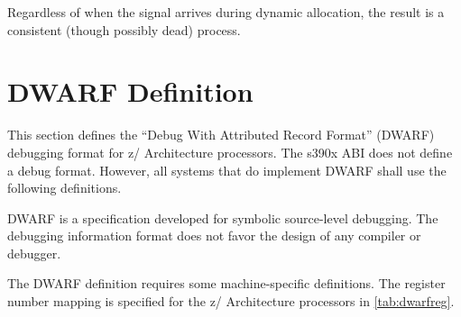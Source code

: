 \documentclass[english,11pt,twoside,toc=bib,toc=idx]{scrreprt}
\newcommand{\ABINAME}{s390x}
\newcommand{\ARCH}{z/\kern-1pt Ar\-chi\-tec\-ture}
\newcommand{\ABINAME}{s390}
\newcommand{\ARCH}{ESA/390}
\begin{document}
Regardless of when the signal arrives during dynamic allocation, the
result is a consistent (though possibly dead) process.

\section{DWARF Definition}
This section defines the ``Debug With Attributed Record Format''
(DWARF) debugging format for \ARCH{} processors.  The
\ABINAME{} ABI does not define a debug format.  However, all systems that
do implement DWARF shall use the following definitions.

DWARF is a specification developed for symbolic source-level
debugging.  The debugging information format does not favor the design
of any compiler or debugger.

The DWARF definition requires some machine-specific definitions.  The
register number mapping is specified for the \ARCH{}
processors in \cref{tab:dwarfreg}.
\end{document}
